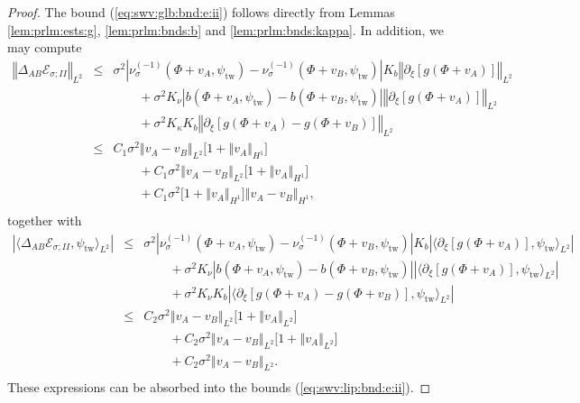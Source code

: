 \documentclass[10pt]{articleHJ}
\newcommand{\abs}[1]{\left\vert#1\right\vert}			%
\newcommand{\norm}[1]{\left\Vert#1\right\Vert}		%
\newcommand{\sref}[1]{(\ref{#1})}                       %
\numberwithin{equation}{section}
\begin{document}
\begin{proof}
The bound \sref{eq:swv:glb:bnd:e:ii}
follows directly
from Lemmas
\ref{lem:prlm:ests:g},
\ref{lem:prlm:bnds:b}
and \ref{lem:prlm:bnds:kappa}.
In addition,
we may compute
\begin{equation}
\begin{array}{lcl}
\norm{\Delta_{AB} \mathcal{E}_{\sigma;II}
}_{L^2}
& \le &
\sigma^2 \abs{\nu^{(-1)}_{\sigma}(\Phi + v_A, \psi_{\mathrm{tw}})
   - \nu^{(-1)}_{\sigma}(\Phi + v_B, \psi_{\mathrm{tw}})
} K_b \norm{\partial_\xi [g(\Phi + v_A) ] }_{L^2}
\\[0.2cm]
& & \qquad
  + \sigma^2 K_{\nu}
  \abs{b(\Phi + v_A, \psi_{\mathrm{tw}})
      - b(\Phi + v_B, \psi_{\mathrm{tw}}) }
  \norm{\partial_\xi [g(\Phi + v_A) ] }_{L^2}
\\[0.2cm]
& & \qquad
  + \sigma^2 K_{\kappa}
      K_b
      \norm{\partial_{\xi}[g(\Phi + v_A) - g(\Phi + v_B) ] }_{L^2}
\\[0.2cm]
& \le &
C_1 \sigma^2
 \norm{v_A-v_B}_{L^2} \big[ 1 + \norm{v_A}_{H^1} \big]
\\[0.2cm]
& & \qquad
+ C_1 \sigma^2
 \norm{v_A-v_B}_{L^2}
\big[ 1 + \norm{v_A}_{H^1} \big]
\\[0.2cm]
& & \qquad
 + C_1 \sigma^2
 \big[ 1 + \norm{v_A}_{H^1}
 \big]
 \norm{v_A-v_B}_{H^1} ,
\\[0.2cm]
\end{array}
\end{equation}
together with
\begin{equation}
\begin{array}{lcl}
\abs{
 \langle \Delta_{AB} \mathcal{E}_{\sigma;II}
 , \psi_{\mathrm{tw}} \rangle_{L^2}
}
& \le &
\sigma^2 \abs{\nu^{(-1)}_{\sigma}(\Phi + v_A, \psi_{\mathrm{tw}})
   - \nu^{(-1)}_{\sigma}(\Phi + v_B, \psi_{\mathrm{tw}})
} K_b \abs{ \langle\partial_\xi [g(\Phi + v_A) ] , \psi_{\mathrm{tw}}
  \rangle_{L^2} }
\\[0.2cm]
& & \qquad
  + \sigma^2 K_{\nu}
  \abs{b(\Phi + v_A, \psi_{\mathrm{tw}})
      - b(\Phi + v_B, \psi_{\mathrm{tw}}) }
  \abs{\langle
    \partial_\xi [g(\Phi + v_A) ], \psi_{\mathrm{tw}}
    \rangle_{L^2} }
\\[0.2cm]
& & \qquad
  + \sigma^2 K_{\nu}
      K_b
      \abs{ \langle
      \partial_{\xi}[g(\Phi + v_A) - g(\Phi + v_B) ],
        \psi_{\mathrm{tw}} \rangle_{L^2} }
\\[0.2cm]
& \le &
C_2 \sigma^2
 \norm{v_A-v_B}_{L^2}
 \big[ 1 + \norm{v_A}_{L^2} \big]
\\[0.2cm]
& & \qquad
+ C_2 \sigma^2
 \norm{v_A-v_B}_{L^2}
\big[ 1 + \norm{v_A}_{L^2} \big]
\\[0.2cm]
& & \qquad
 + C_2 \sigma^2
  \norm{v_A-v_B}_{L^2}.
\\[0.2cm]
\end{array}
\end{equation}
These expressions can be absorbed
into the bounds \sref{eq:swv:lip:bnd:e:ii}.
\end{proof}
\end{document}
